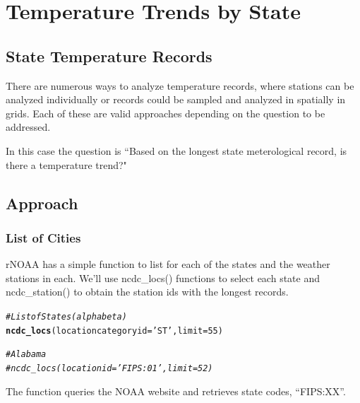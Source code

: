\documentclass{article}\usepackage[]{graphicx}\usepackage[]{color}
\makeatletter
\newcommand{\hlnum}[1]{\textcolor[rgb]{0.686,0.059,0.569}{#1}}%
\newcommand{\hlstr}[1]{\textcolor[rgb]{0.192,0.494,0.8}{#1}}%
\newcommand{\hlcom}[1]{\textcolor[rgb]{0.678,0.584,0.686}{\textit{#1}}}%
\newcommand{\hlstd}[1]{\textcolor[rgb]{0.345,0.345,0.345}{#1}}%
\newcommand{\hlkwc}[1]{\textcolor[rgb]{0.333,0.667,0.333}{#1}}%
\newcommand{\hlkwd}[1]{\textcolor[rgb]{0.737,0.353,0.396}{\textbf{#1}}}%
\newenvironment{kframe}{%
 \def\at@end@of@kframe{}%
 \ifinner\ifhmode%
  \def\at@end@of@kframe{\end{minipage}}%
  \begin{minipage}{\columnwidth}%
 \fi\fi%
 \def\FrameCommand##1{\hskip\@totalleftmargin \hskip-\fboxsep
 \colorbox{shadecolor}{##1}\hskip-\fboxsep
     \hskip-\linewidth \hskip-\@totalleftmargin \hskip\columnwidth}%
 \MakeFramed {\advance\hsize-\width
   \@totalleftmargin\z@ \linewidth\hsize
   \@setminipage}}%
 {\par\unskip\endMakeFramed%
 \at@end@of@kframe}
\newenvironment{knitrout}{}{} %
\makeatother
\begin{document}
\section{Temperature Trends by State}

\subsection{State Temperature Records}

There are numerous ways to analyze temperature records, where stations can be analyzed individually or records could be sampled and analyzed in spatially in grids. Each of these are valid approaches depending on the question to be addressed. 

In this case the question is ``Based on the longest state meterological record, is there a temperature trend?"

\subsection{Approach}

\subsubsection{List of Cities}

rNOAA has a simple function to list for each of the states and the weather stations in each. We'll use ncdc\_locs() functions to select each state and ncdc\_station() to obtain the station ids with the longest records. 

\begin{knitrout}
\color{fgcolor}\begin{kframe}
\begin{alltt}
\hlcom{# List of States (alpha beta)}
\hlkwd{ncdc_locs}\hlstd{(}\hlkwc{locationcategoryid}\hlstd{=}\hlstr{'ST'}\hlstd{,} \hlkwc{limit}\hlstd{=}\hlnum{55}\hlstd{)}

\hlcom{# Alabama }
\hlcom{# ncdc_locs(locationid='FIPS:01', limit=52)}
\end{alltt}
\end{kframe}
\end{knitrout}

The function queries the NOAA website and retrieves state codes, ``FIPS:XX''.  

\end{document}
